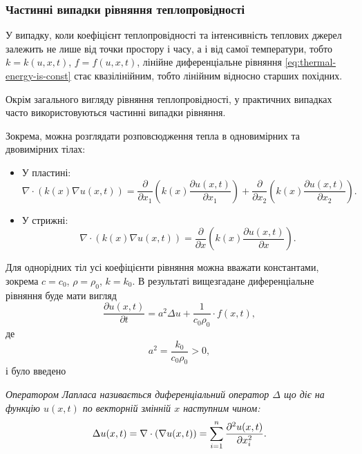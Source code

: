 \subsubsection{Частинні випадки рівняння теплопровідності}

\begin{remark}
	У випадку, коли коефіцієнт теплопровідності та інтенсивність теплових джерел залежить не лише від точки простору і часу, а і від самої температури, тобто $k = k(u, x, t)$, $f = f(u, x, t)$, лінійне диференціальне рівняння \eqref{eq:thermal-energy-is-const} стає квазілінійним, тобто лінійним відносно старших похідних.
\end{remark}

Окрім загального вигляду рівняння теплопровідності, у практичних випадках часто використовуються частинні випадки рівняння. \medskip

Зокрема, можна розглядати розповсюдження тепла в одновимірних та двовимірних тілах:
\begin{itemize}
	\item У пластині:
	\begin{equation}
		\nabla \cdot (k(x) \nabla u(x, t)) = \frac{\partial}{\partial x_1} \left( k(x) \frac{\partial u(x, t)}{\partial x_1} \right) + \frac{\partial}{\partial x_2} \left( k(x) \frac{\partial u(x, t)}{\partial x_2} \right).
	\end{equation}
	\item У стрижні:
	\begin{equation}
		\nabla \cdot (k(x) \nabla u(x, t)) = \frac{\partial}{\partial x} \left( k(x) \frac{\partial u(x, t)}{\partial x} \right).
	\end{equation}
\end{itemize}

Для однорідних тіл усі коефіцієнти рівняння можна вважати константами, зокрема $c = c_0$, $\rho = \rho_0$, $k = k_0$. В результаті вищезгадане диференціальне рівняння буде мати вигляд
\begin{equation}
	\frac{\partial u(x, t)}{\partial t} = a^2 \Delta u + \frac{1}{c_0 \rho_0} \cdot f(x, t),
\end{equation}
де 
\begin{equation}
	a^2 = \frac{k_0}{c_0 \rho_0} > 0,
\end{equation}
і було введено
\begin{definition}
	\it{Оператором Лапласа} називається диференціальний оператор $\Delta$ що діє на функцію $u(x, t)$ по векторній змінній $x$ наступним чином:
	\begin{equation}
		\Delta u(x, t) = \nabla \cdot (\nabla u(x, t)) = \displaystyle\sum\limits_{i = 1}^n \frac{\partial^2 u(x, t)}{\partial x_i^2}.
	\end{equation}
\end{definition}

